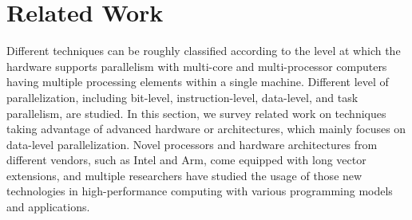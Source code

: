 \documentclass[5p,times,twocolumn]{elsarticle}
\begin{document}
\section{Related Work}\label{sec:related}
Different techniques can be roughly classified according to the level at which
the hardware supports parallelism with multi-core and multi-processor computers having
multiple processing elements within a single machine. Different level of parallelization,
including bit-level, instruction-level, data-level, and task parallelism, are studied.
%
In this section, we survey related work on techniques taking advantage of
advanced hardware or architectures, which mainly focuses on data-level parallelization.
Novel processors and hardware architectures from different vendors, such as Intel and Arm,
come equipped with long vector extensions, and multiple researchers have studied the usage
of those new technologies in high-performance computing with various programming models and applications.
%
\end{document}
